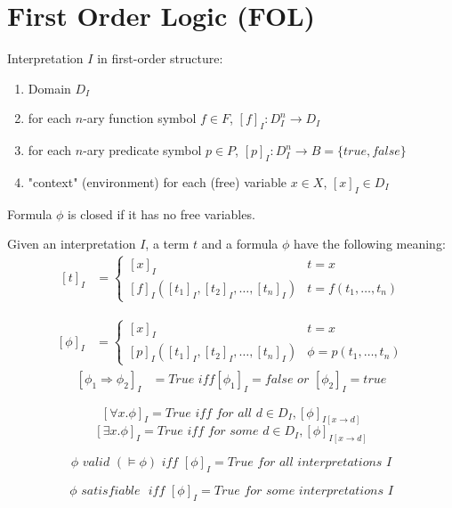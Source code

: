 \chapter{First Order Logic (FOL)}
\begin{definition}
    Interpretation $I$ in first-order structure: 
    \begin{enumerate}
        \item Domain $D_I$
        \item for each $n$-ary function symbol $f \in F$, $[f]_I: D_I^n \to D_I$
        \item for each $n$-ary predicate symbol $p \in P$, $[p]_I: D_I^n \to B = \{true,false\}$
        \item "context" (environment) for each (free) variable $x \in X$, $[x]_I \in D_I$
    \end{enumerate}
\end{definition}
Formula $\phi$ is closed if it has no free variables.

Given an interpretation $I$, a term $t$ and a formula $\phi$ have the following meaning: 
\[
\begin{split}
    [t]_I &= \begin{cases}
        [x]_I & t=x  \\
        [f]_I([t_1]_I, [t_2]_I, \dots, [t_n]_I) & t=f(t_1, \dots, t_n)
    \end{cases}
\end{split}
\]

\[
\begin{split}
    [\phi]_I &= \begin{cases}
        [x]_I & t=x  \\
        [p]_I([t_1]_I, [t_2]_I, \dots, [t_n]_I) & \phi = p(t_1, \dots, t_n)
    \end{cases}
\end{split}
\]
\[
\begin{split}
    [\phi_1 \Rightarrow \phi_2]_I &= \textit{True iff} [\phi_1]_I = false \textit{ or } [\phi_2]_I = true
\end{split}
\]

\[
[\forall x. \phi]_I = \textit{True iff for all } d \in D_I, [\phi]_{I[x \to d]}
\]
\[
[\exists x. \phi]_I = \textit{True iff for some } d \in D_I, [\phi]_{I[x \to d]}
\]

\[
\phi \textit{ valid } (\vDash \phi) \textit{ iff } [\phi]_I = \textit{True for all interpretations } I  
\]


\[
\phi \textit{ satisfiable } \textit{ iff } [\phi]_I = \textit{True for some interpretations } I 
\]



